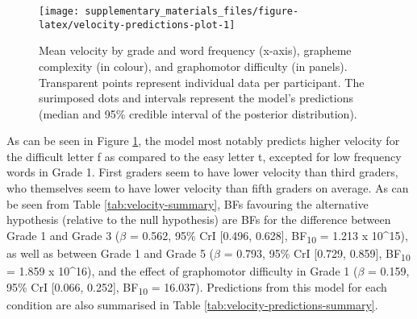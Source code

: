 \documentclass[
  11pt,
  english,
  ,doc,floatsintext]{apa6}
\begin{document}
\begin{figure}[!htb]

{\centering \texttt{[image: supplementary\_materials\_files/figure-latex/velocity-predictions-plot-1]} 

}

\caption{Mean velocity by grade and word frequency (x-axis), grapheme complexity (in colour), and graphomotor difficulty (in panels). Transparent points represent individual data per participant. The surimposed dots and intervals represent the model's predictions (median and 95\% credible interval of the posterior distribution).}\label{fig:velocity-predictions-plot}
\end{figure}

As can be seen in Figure \ref{fig:velocity-predictions-plot}, the model most notably predicts higher velocity for the difficult letter f as compared to the easy letter t, excepted for low frequency words in Grade 1. First graders seem to have lower velocity than third graders, who themselves seem to have lower velocity than fifth graders on average. As can be seen from Table \ref{tab:velocity-summary}, BFs favouring the alternative hypothesis (relative to the null hypothesis) are BFs for the difference between Grade 1 and Grade 3 (\(\beta\) = 0.562, 95\% CrI {[}0.496, 0.628{]}, BF\textsubscript{10} = 1.213 x 10\^{}15), as well as between Grade 1 and Grade 5 (\(\beta\) = 0.793, 95\% CrI {[}0.729, 0.859{]}, BF\textsubscript{10} = 1.859 x 10\^{}16), and the effect of graphomotor difficulty in Grade 1 (\(\beta\) = 0.159, 95\% CrI {[}0.066, 0.252{]}, BF\textsubscript{10} = 16.037). Predictions from this model for each condition are also summarised in Table \ref{tab:velocity-predictions-summary}.
\end{document}

